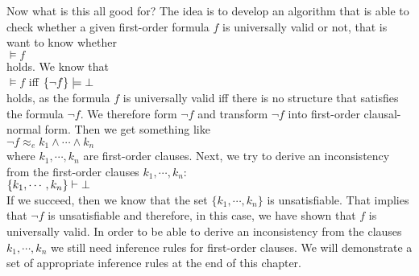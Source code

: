 Now what is this all good for?  The idea is to develop an algorithm that is able to check
whether a given first-order formula $f$ is universally valid or not, that is want to know whether
\\[0.2cm]
\hspace*{1.3cm} $\models f$ \\[0.2cm]
holds.  We know that \\[0.2cm]
\hspace*{1.3cm} 
$\models f$ \quad iff \quad $\{\neg f\} \models \bot$ \\[0.2cm]
holds, as the formula  $f$ is universally valid iff there is no structure that satisfies
the formula  $\neg f$.  We therefore form  $\neg f$ and transform $\neg f$ into
first-order clausal-normal form.  Then we get something like  
\\[0.2cm]
\hspace*{1.3cm}
$\neg f \approx_e k_1 \wedge \cdots \wedge k_n$
 \\[0.2cm]
where $k_1,\cdots,k_n$ are first-order clauses.
Next, we try to derive an inconsistency from the first-order clauses  $k_1,\cdots,k_n$: \\[0.2cm]
\hspace*{1.3cm} $\{k_1, \cdots, k_n\} \vdash \bot$ \\[0.2cm]
If we succeed, then we know that the set  $\{k_1, \cdots, k_n\}$ is unsatisfiable.
That implies that  $\neg f$ is unsatisfiable and therefore, in this case, we have shown
that $f$ is universally valid.
In order to be able to derive an inconsistency from the clauses  $k_1,\cdots,k_n$ we still
need inference rules for first-order clauses.  We will demonstrate a set of appropriate
inference rules at the end of this chapter.

